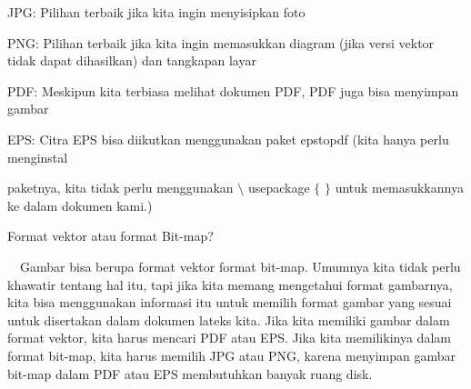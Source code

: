 JPG: Pilihan terbaik jika kita ingin menyisipkan foto \par
\noindent 
PNG: Pilihan terbaik jika kita ingin memasukkan diagram (jika versi vektor tidak dapat dihasilkan) dan tangkapan layar \par
\noindent 
PDF: Meskipun kita terbiasa melihat dokumen PDF, PDF juga bisa menyimpan gambar \par
\noindent 
EPS: Citra EPS bisa diikutkan menggunakan paket epstopdf (kita hanya perlu menginstal  \par
\vspace{12pt}
\noindent 
paketnya, kita $  $tidak perlu menggunakan  $  \setminus $ usepackage  $  \{  $ $  \}  $ untuk memasukkannya ke dalam dokumen kami.) \par
\vspace{12pt}
\noindent 
Format vektor atau format Bit-map? \par
\noindent 
 $  $ $  $ $  $ $  $Gambar bisa berupa format vektor format bit-map. Umumnya kita tidak perlu khawatir tentang hal itu, tapi jika kita memang mengetahui format gambarnya, kita bisa menggunakan informasi itu untuk memilih format gambar yang sesuai untuk disertakan dalam dokumen lateks kita. Jika kita memiliki gambar dalam format vektor, kita harus mencari PDF atau EPS. Jika kita memilikinya dalam format bit-map, kita harus memilih JPG atau PNG, karena menyimpan gambar bit-map dalam PDF atau EPS membutuhkan banyak ruang disk. \par
\vspace{20pt}

